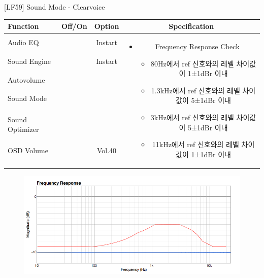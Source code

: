 \begin{frame}[t]{[LF59] Sound Mode - Clearvoice}
\begin{tiny}
\begin{tabular}{@{}lccc@{}}
\toprule
Function & Off/On & Option & Specification \\
\midrule
Audio EQ & \color{black}{Off} & Instart &
\multirow{8}{60mm}{
\begin{itemize}
\item Frequency Response Check
	\begin{itemize}
	\item 80Hz에서 ref 신호와의 레벨 차이값이 1±1dBr 이내
	\item 1.3kHz에서 ref 신호와의 레벨 차이값이 5±1dBr 이내
	\item 3kHz에서 ref 신호와의 레벨 차이값이 5±1dBr 이내
	\item 11kHz에서 ref 신호와의 레벨 차이값이 1±1dBr 이내
	\end{itemize}
\end{itemize}
} \\
Sound Engine & \color{blue}{On} & Instart & \\
Autovolume & \color{black}{Off} & & \\
Sound Mode & \color{blue}{On} & \color{blue}{Clearvoice} & \\
Sound Optimizer & \color{black}{Off} & & \\
OSD Volume & \color{blue}{On} & Vol.40 & \\
 & & & \\
 & & & \\
\midrule
\end{tabular}
\end{tiny}

\begin{figure}[b]
\includegraphics[height=0.4\textwidth]{figures/Clearvoice.png}
\end{figure}

\end{frame}
